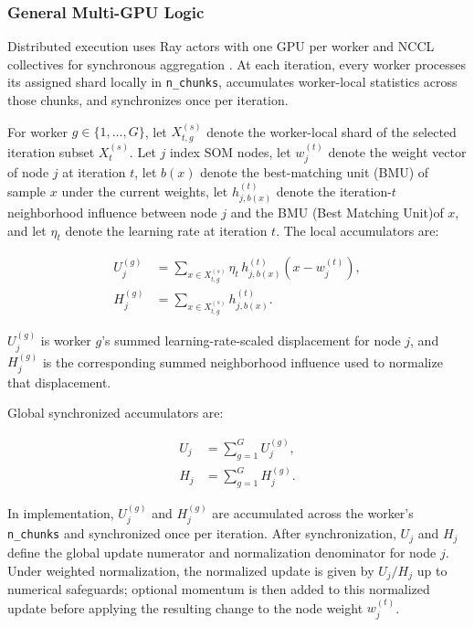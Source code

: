 \documentclass[11pt]{article}
\begin{document}
\subsubsection{General Multi-GPU Logic}

Distributed execution uses Ray actors with one GPU per worker and NCCL collectives for synchronous aggregation \citep{moritzRayDistributedFramework2018}. At each iteration, every worker processes its assigned shard locally in \texttt{n\_chunks}, accumulates worker-local statistics across those chunks, and synchronizes once per iteration.

For worker $g \in \{1,\dots,G\}$, let $X_{t,g}^{(s)}$ denote the worker-local shard of the selected iteration subset $X_t^{(s)}$. Let $j$ index SOM nodes, let $w_j^{(t)}$ denote the weight vector of node $j$ at iteration $t$, let $b(x)$ denote the best-matching unit (BMU) of sample $x$ under the current weights, let $h_{j,b(x)}^{(t)}$ denote the iteration-$t$ neighborhood influence between node $j$ and the BMU (Best Matching Unit)of $x$, and let $\eta_t$ denote the learning rate at iteration $t$. The local accumulators are:

\[
\begin{aligned}
 U_j^{(g)} &= \sum_{x \in X_{t,g}^{(s)}} \eta_t\,h_{j,b(x)}^{(t)}(x-w_j^{(t)}), \\
 H_j^{(g)} &= \sum_{x \in X_{t,g}^{(s)}} h_{j,b(x)}^{(t)}.
\end{aligned}
\tag{3}
\]

$U_j^{(g)}$ is worker $g$'s summed learning-rate-scaled displacement for node $j$, and $H_j^{(g)}$ is the corresponding summed neighborhood influence used to normalize that displacement.

Global synchronized accumulators are:

\[
\begin{aligned}
U_j &= \sum_{g=1}^{G} U_j^{(g)}, \\
H_j &= \sum_{g=1}^{G} H_j^{(g)}.
\end{aligned}
\tag{4}
\]

In implementation, $U_j^{(g)}$ and $H_j^{(g)}$ are accumulated across the worker's \texttt{n\_chunks} and synchronized once per iteration. After synchronization, $U_j$ and $H_j$ define the global update numerator and normalization denominator for node $j$. Under weighted normalization, the normalized update is given by $U_j/H_j$ up to numerical safeguards; optional momentum is then added to this normalized update before applying the resulting change to the node weight $w_j^{(t)}$.
\end{document}
